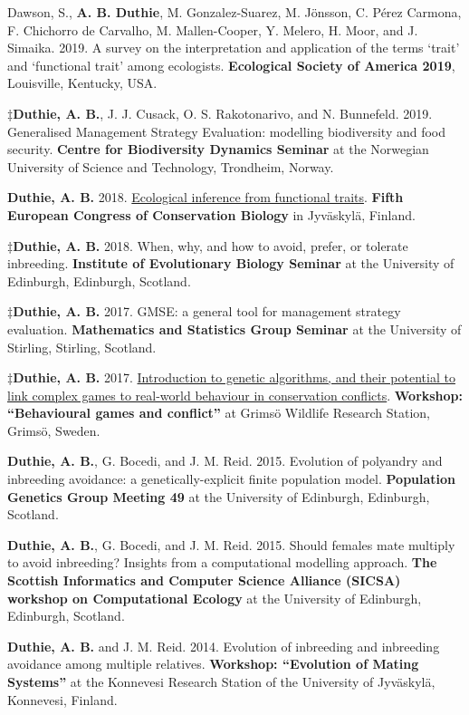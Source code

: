 \documentclass[letterpaper]{article}
\renewenvironment{itemize}{
  \begin{list}{}{
    \setlength{\leftmargin}{1.5em}
  }
}{
  \end{list}
}
\begin{document}
\begin{itemize}
\item Dawson, S., {\bf A. B. Duthie}, M. Gonzalez-Suarez, M. J\"{o}nsson, C. P\'{e}rez Carmona, F. Chichorro de Carvalho, M. Mallen-Cooper, Y. Melero, H. Moor, and J. Simaika. 2019. A survey on the interpretation and application of the terms `trait' and `functional trait' among ecologists. {\bf Ecological Society of America 2019}, Louisville, Kentucky, USA.
\item $\ddagger${\bf Duthie, A. B.}, J. J. Cusack, O. S. Rakotonarivo, and N. Bunnefeld. 2019. Generalised Management Strategy Evaluation: modelling biodiversity and food security. {\bf Centre for Biodiversity Dynamics Seminar} at the Norwegian University of Science and Technology, Trondheim, Norway.
\item {\bf Duthie, A. B.} 2018. \href{https://www.dropbox.com/s/v42iqdccpkyg55w/Duthie_ECCB2018.pdf?dl=0}{Ecological inference from functional traits}. {\bf Fifth European Congress of Conservation Biology} in Jyv\"{a}skyl\"{a}, Finland.
\item $\ddagger${\bf Duthie, A. B.} 2018. When, why, and how to avoid, prefer, or tolerate inbreeding. {\bf Institute of Evolutionary Biology Seminar} at the University of Edinburgh, Edinburgh, Scotland.
\item $\ddagger${\bf Duthie, A. B.} 2017. GMSE: a general tool for management strategy evaluation. {\bf Mathematics and Statistics Group Seminar} at the University of Stirling, Stirling, Scotland.
\item $\ddagger${\bf Duthie, A. B.} 2017. \href{https://bradduthie.shinyapps.io/GRIMSO}{Introduction to genetic algorithms, and their potential to link complex games to real-world behaviour in conservation conflicts}. {\bf Workshop: ``Behavioural games and conflict''} at Grims\"{o} Wildlife Research Station, Grims\"{o}, Sweden.
\item {\bf Duthie, A. B.}, G. Bocedi, and J. M. Reid. 2015. Evolution of polyandry and inbreeding avoidance: a genetically-explicit finite population model. {\bf Population Genetics Group Meeting 49} at the University of Edinburgh, Edinburgh, Scotland.
\item {\bf Duthie, A. B.}, G. Bocedi, and J. M. Reid. 2015. Should females mate multiply to avoid inbreeding? Insights from a computational modelling approach. {\bf The Scottish Informatics and Computer Science Alliance (SICSA) workshop on Computational Ecology} at the University of Edinburgh, Edinburgh, Scotland.
\item {\bf Duthie, A. B.} and J. M. Reid. 2014. Evolution of inbreeding and inbreeding avoidance among multiple relatives. {\bf Workshop: ``Evolution of Mating Systems''} at the Konnevesi Research Station of the University of Jyv\"{a}skyl\"{a}, Konnevesi, Finland.

\end{itemize}
\end{document}
